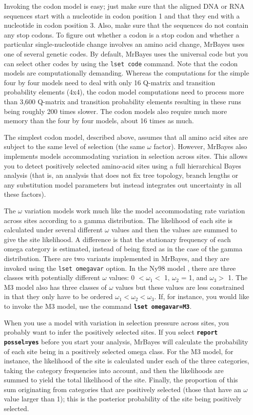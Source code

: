 \documentclass[12pt]{book}
\newcommand{\ttt}[1]{\texttt{#1}}
\newcommand{\tb}[1]{\ttt{\textbf{#1}}}
\begin{document}
Invoking the codon model is easy; just make sure that the aligned DNA or RNA sequences start with a
nucleotide in codon position 1 and that they end with a nucleotide in codon position 3. Also, make
sure that the sequences do not contain any stop codons. To figure out whether a codon is a stop
codon and whether a particular single-nucleotide change involves an amino acid change, MrBayes uses
one of several genetic codes. By default, MrBayes uses the universal code but you can select other
codes by using the \ttt{lset code} command. Note that the codon models are computationally
demanding. Whereas the computations for the simple four by four models need to deal with only 16
Q-matrix and transition probability elements (4x4), the codon model computations need to process
more than 3,600 Q-matrix and transition probability elements resulting in these runs being roughly
200 times slower. The codon models also require much more memory than the four by four models,
about 16 times as much.

The simplest codon model, described above, assumes that all amino acid sites are subject to the
same level of selection (the same $\omega$ factor). However, MrBayes also implements models
accommodating variation in selection across sites. This allows you to detect positively selected
amino-acid sites using a full hierarchical Bayes analysis (that is, an analysis that does not fix
tree topology, branch lengths or any substitution model parameters but instead integrates out
uncertainty in all these factors).

The $\omega$ variation models work much like the model accommodating rate variation across sites
according to a gamma distribution. The likelihood of each site is calculated under several
different $\omega$ values and then the values are summed to give the site likelihood. A difference
is that the stationary frequency of each omega category is estimated, instead of being fixed as in
the case of the gamma distribution. There are two variants implemented in MrBayes, and they are
invoked using the \ttt{lset omegavar} option. In the Ny98 model \citep{nielsen98}, there are three
classes with potentially different $\omega$ values: 0 $< \omega_1 <$ 1, $\omega_2$ = 1, and
$\omega_3 >$ 1. The M3 model also has three classes of $\omega$ values but these values are less
constrained in that they only have to be ordered $\omega_1 < \omega_2 < \omega_3$. If, for
instance, you would like to invoke the M3 model, use the command \tb{lset omegavar=M3}.

When you use a model with variation in selection pressure across sites, you probably want to infer
the positively selected sites. If you select \tb{report possel=yes} before you start your analysis,
MrBayes will calculate the probability of each site being in a positively selected omega class. For
the M3 model, for instance, the likelihood of the site is calculated under each of the three
categories, taking the category frequencies into account, and then the likelihoods are summed to
yield the total likelihood of the site. Finally, the proportion of this sum originating from
categories that are positively selected (those that have an $\omega$ value larger than 1); this is
the posterior probability of the site being positively selected.
\end{document}
